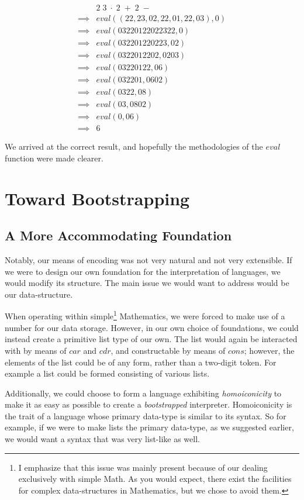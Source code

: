 \documentclass{article}
\begin{document}
\begin{align*}
    &2 \; 3 \; \cdot \; 2 \; + \; 2 \; -
\\  \implies &eval((22, 23, 02, 22, 01, 22, 03), 0)    
\\  \implies &eval(03220122022322, 0)
\\  \implies &eval(032201220223, 02)
\\  \implies &eval(0322012202, 0203)
\\  \implies &eval(03220122, 06)
\\  \implies &eval(032201, 0602)
\\  \implies &eval(0322, 08)
\\  \implies &eval(03, 0802)
\\  \implies &eval(0, 06)
\\  \implies &6
\end{align*}

We arrived at the correct result, and hopefully the methodologies of the $eval$ function were made
clearer.

\section{Toward Bootstrapping}
\subsection{A More Accommodating Foundation}
Notably, our means of encoding was not very natural and not very extensible. If we were to design our
own foundation for the interpretation of languages, we would modify its structure. The main issue we
would want to address would be our data-structure. 

When operating within simple\footnote{I emphasize that this issue was mainly present because of our dealing 
exclusively with simple Math. As you would expect, there exist the facilities for complex data-structures in 
Mathematics, but we chose to avoid them.} Mathematics, we were forced to make use of a number for our data 
storage. However, in our own choice of foundations, we could instead create a primitive list type of our own. 
The list would again be interacted with by means of $car$ and $cdr$, and constructable by means of 
$cons$; however, the elements of the list could be of any form, rather than a two-digit token. For 
example a list could be formed consisting of various lists.

Additionally, we could choose to form a language exhibiting \emph{homoiconicity} to make it as easy as 
possible to create a \emph{bootstrapped} interpreter. Homoiconicity is the trait of a language whose
primary data-type is similar to its syntax. So for example, if we were to make lists the primary 
data-type, as we suggested earlier, we would want a syntax that was very list-like as well.
\end{document}
